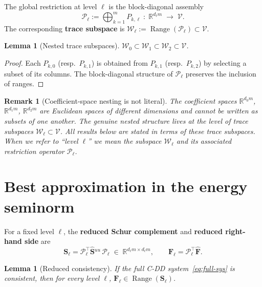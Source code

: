 \documentclass[11pt,a4paper]{article}
\newtheorem{lemma}[theorem]{Lemma}
\newtheorem{remark}[theorem]{Remark}
\theoremstyle{definition}
\newcommand{\R}{\mathbb{R}}
\newcommand{\Schur}{\mathbf{S}}
\newcommand{\Shatuu}{\widehat{\Schur}{}^{uu}}
\newcommand{\Fhat}{\widehat{\bm{F}}}
\newcommand{\Range}{\operatorname{Range}}
\newcommand{\Vspace}{\mathcal{V}}
\newcommand{\Wspace}{\mathcal{W}}
\newcommand{\Pcal}{\mathcal{P}}
\begin{document}
The global restriction at level $\ell$ is the block-diagonal assembly
\begin{equation}\label{eq:Pcal}
  \Pcal_\ell := \bigoplus_{k=1}^m P_{k,\ell}
  \;:\; \R^{d_\ell m} \;\longrightarrow\; \Vspace.
\end{equation}
The corresponding \textbf{trace subspace} is
$\Wspace_\ell := \Range(\Pcal_\ell) \subset \Vspace$.

\begin{lemma}[Nested trace subspaces]\label{lem:nested}
  $\Wspace_0 \subset \Wspace_1 \subset \Wspace_2 \subset \Vspace$.
\end{lemma}

\begin{proof}
  Each $P_{k,0}$ (resp.\ $P_{k,1}$) is obtained from $P_{k,1}$
  (resp.\ $P_{k,2}$) by selecting a subset of its columns.
  The block-diagonal structure of $\Pcal_\ell$ preserves the inclusion
  of ranges.
\end{proof}

\begin{remark}[Coefficient-space nesting is not literal]\label{rem:coeff-nest}
  The coefficient spaces $\R^{d_0 m}$, $\R^{d_1 m}$, $\R^{d_2 m}$ are
  Euclidean spaces of different dimensions and cannot be written as
  subsets of one another.  The genuine nested structure lives at the
  level of \emph{trace subspaces} $\Wspace_\ell \subset \Vspace$.
  All results below are stated in terms of these trace subspaces.
  When we refer to ``level $\ell$'' we mean the subspace $\Wspace_\ell$
  and its associated restriction operator $\Pcal_\ell$.
\end{remark}

\section{Best approximation in the energy seminorm}

For a fixed level $\ell$, the \textbf{reduced Schur complement} and
\textbf{reduced right-hand side} are
\begin{equation}\label{eq:S-ell}
  \Schur_\ell = \Pcal_\ell^\top \Shatuu\, \Pcal_\ell
  \;\in\; \R^{d_\ell m \times d_\ell m},\qquad
  \bm{F}_\ell = \Pcal_\ell^\top \Fhat.
\end{equation}

\begin{lemma}[Reduced consistency]\label{lem:reduced-cons}
  If the full C-DD system~\eqref{eq:full-sys} is consistent, then for
  every level $\ell$,
  $\bm{F}_\ell \in \Range(\Schur_\ell)$.
\end{lemma}
\end{document}
